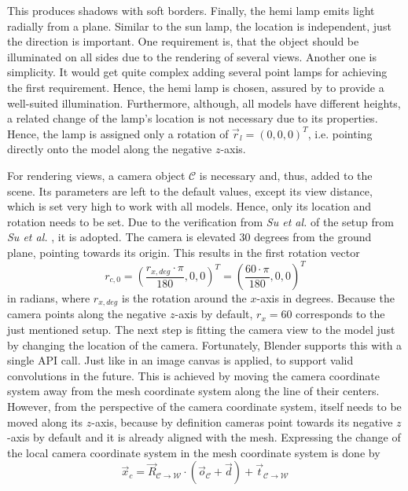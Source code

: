 This produces shadows with soft borders.
Finally, the hemi lamp emits light radially from a plane.
Similar to the sun lamp, the location is independent, just the direction is important.
One requirement is, that the object should be illuminated on all sides due to the rendering of several views.
Another one is simplicity.
It would get quite complex adding several point lamps for achieving the first requirement.
Hence, the hemi lamp is chosen, assured by  to provide a well-suited illumination.
Furthermore, although, all models have different heights, a related change of the lamp's location is not necessary due to its properties.
Hence, the lamp is assigned only a rotation of $\vec{r}_l = (0,0,0)^T$, i.e. pointing directly onto the model along the negative $z$-axis.

For rendering views, a camera object $\mathcal{C}$ is necessary and, thus, added to the scene.
Its parameters are left to the default values, except its view distance, which is set very high to work with all models.
Hence, only its location and rotation needs to be set.
Due to the verification from \textit{Su et al.} \cite{Su2018} of the setup from \textit{Su et al.} \cite{Su:2015:MCN:2919332.2919750}, it is adopted.
The camera is elevated 30 degrees from the ground plane, pointing towards its origin.
This results in the first rotation vector
\begin{equation}
	r_{c,0} = \left( \frac{r_{x,deg} \cdot \pi}{180}, 0, 0 \right)^T = \left( \frac{60 \cdot \pi}{180}, 0, 0 \right)^T
\end{equation}
in radians, where $r_{x,deg}$ is the rotation around the $x$-axis in degrees.
Because the camera points along the negative $z$-axis by default, $r_x = 60$ corresponds to the just mentioned setup.
The next step is fitting the camera view to the model just by changing the location of the camera.
Fortunately, Blender supports this with a single API call.
Just like in \cite{Su2018} an image canvas is applied, to support valid convolutions in the future.
This is achieved by moving the camera coordinate system away from the mesh coordinate system along the line of their centers.
However, from the perspective of the camera coordinate system, itself needs to be moved along its $z$-axis, because by definition cameras point towards its negative $z$-axis by default and it is already aligned with the mesh.
Expressing the change of the local camera coordinate system in the mesh coordinate system is done by
\begin{equation}
	\vec{x}_c = \vec{R}_{\mathcal{C} \rightarrow \mathcal{W}} \cdot (\vec{o}_{\mathcal{C}} + \vec{d}) + \vec{t}_{\mathcal{C} \rightarrow \mathcal{W}}
\end{equation}
